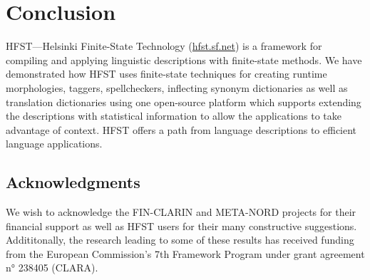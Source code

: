 \documentclass[draft]{llncs}
\begin{document}

\section{Conclusion}
HFST---Helsinki Finite-State Technology (\url{hfst.sf.net})
is a framework for compiling and applying linguistic descriptions
with finite-state methods. We have demonstrated how HFST uses finite-state techniques 
for creating runtime morphologies, taggers, spellcheckers, inflecting synonym dictionaries as well as 
translation dictionaries using one open-source platform which supports extending  
the descriptions with statistical information to allow the applications 
to take advantage of context. HFST offers a path from language descriptions 
to efficient language applications.


\subsection*{Acknowledgments}
We wish to acknowledge the FIN-CLARIN and META-NORD projects for their financial support 
as well as HFST users for their many constructive suggestions. Addititonally, the research leading to some of these results has received funding from the European Commission’s 7th Framework Program under grant agreement n° 238405 (CLARA).





\end{document}
